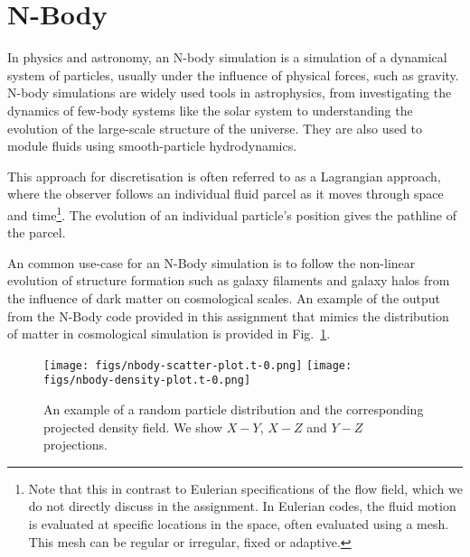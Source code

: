 
\section{N-Body}
\label{sec:nbody}
In physics and astronomy, an N-body simulation is a simulation of a dynamical system of particles, usually under the influence of physical forces, such as gravity. N-body simulations are widely used tools in astrophysics, from investigating the dynamics of few-body systems like the solar system to understanding the evolution of the large-scale structure of the universe. They are also used to module fluids using smooth-particle hydrodynamics. 

\par 
This approach for discretisation is often referred to as a Lagrangian approach, where the observer follows an individual fluid parcel as it moves through space and time\footnote{Note that this in contrast to Eulerian specifications of the flow field, which we do not directly discuss in the assignment. In Eulerian codes, the fluid motion is evaluated at specific locations in the space, often evaluated using a mesh. This mesh can be regular or irregular, fixed or adaptive.}. The evolution of an individual particle's position gives the pathline of the parcel. 

\par 
An common use-case for an N-Body simulation is to follow the non-linear evolution of structure formation such as galaxy filaments and galaxy halos from the influence of dark matter on cosmological scales. An example of the output from the N-Body code provided in this assignment that mimics the distribution of matter in cosmological simulation is provided in Fig.~\ref{fig:nbody-distribution}.
\begin{figure}[!h]	
	\centering
	\texttt{[image: figs/nbody-scatter-plot.t-0.png]}
	\texttt{[image: figs/nbody-density-plot.t-0.png]}
	\caption{An example of a random particle distribution and the corresponding projected density field. We show $X-Y$, $X-Z$ and $Y-Z$ projections.}
	\label{fig:nbody-distribution}
\end{figure}


